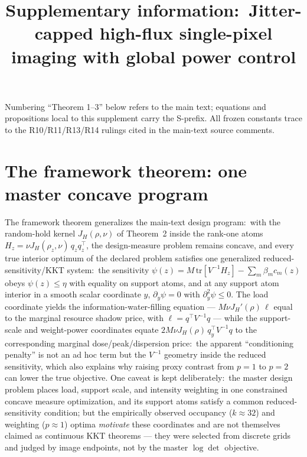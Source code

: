 \documentclass[10pt]{article}
\title{Supplementary information:\ Jitter-capped high-flux single-pixel
imaging with global power control}
\author{\SPH{author block --- user decision (mirrors main text)}}
\date{}
\begin{document}
\maketitle

Numbering ``Theorem 1--3'' below refers to the main text; equations and
propositions local to this supplement carry the S-prefix. All frozen
constants trace to the R10/R11/R13/R14 rulings cited in the main-text source
comments.

\section{The framework theorem: one master concave program}
\label{sec:s-framework}
The framework theorem generalizes the main-text design program:\ with the
random-hold kernel $J_H(\rho,\nu)$ of Theorem~2 inside the
rank-one atoms $H_z = \nu J_H(\rho_z,\nu)\,q_z q_z^{\top}$, the
design-measure problem remains concave, and every
true interior optimum of the declared problem satisfies one generalized
reduced-sensitivity/KKT system:\ the sensitivity
$\psi(z) = M\,\mathrm{tr}[V^{-1}H_z] - \sum_m \beta_m c_m(z)$ obeys
$\psi(z)\le\eta$ with equality on support atoms, and at any support atom
interior in a smooth scalar coordinate $y$, $\partial_y\psi = 0$ with
$\partial^2_y\psi \le 0$. The load coordinate yields the
information-water-filling equation --- $M\nu J_H'(\rho)\,\ell$ equal to the
marginal resource shadow price, with $\ell = q^{\top}V^{-1}q$ --- while the
support-scale and weight-power coordinates equate
$2M\nu J_H(\rho)\,q_y^{\top}V^{-1}q$ to the corresponding marginal
dose/peak/dispersion price:\ the apparent ``conditioning penalty'' is not an
ad hoc term but the $V^{-1}$ geometry inside the reduced sensitivity, which
also explains why raising proxy contrast from $p=1$ to $p=2$ can lower the
true objective. One caveat is kept deliberately:\ the master design problem
places load, support scale, and intensity weighting in one constrained
concave measure optimization, and its support atoms satisfy a common
reduced-sensitivity condition; but the empirically observed occupancy
($k\approx32$) and weighting ($p\approx1$) optima \emph{motivate} these
coordinates and are not themselves claimed as continuous KKT theorems ---
they were selected from discrete grids and judged by image endpoints, not by
the master $\log\det$ objective.
\end{document}
